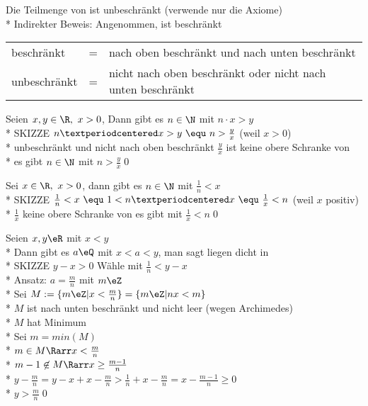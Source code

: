Die Teilmenge \N{} von \R{} ist unbeschränkt
\bew
(verwende nur die Axiome)\\*
Indirekter Beweis: Angenommen, \N{} ist beschränkt
\begin{tabular}{lcl}
beschränkt &=& nach oben beschränkt und nach unten beschränkt\\*
unbeschränkt &=& nicht nach oben beschränkt oder nicht nach unten beschränkt
\end{tabular}
%
Seien $x,y\in\R,\ x>0$, Dann gibt es $n\in\N$ mit $n·x>y$\\*
SKIZZE %
%
\bew
$n·x>y\ \equ\ n>\frac{y}{x}$ (weil $x>0$)\\*
\N{} unbeschränkt und nicht nach oben beschränkt \Rarr{} $\frac{y}{x}$ ist keine obere Schranke von \N\\*
\Rarr{} es gibt $n\in\N$ mit $n>\frac{y}{x}$\qed

Sei $x\in\R,\ x>0$, dann gibt es $n\in\N$ mit $\frac{1}{n}<x$\\*
SKIZZE %
\bew
$\frac{1}{n}<x\ \equ\ 1<n·x\ \equ\ \frac{1}{x}<n$ (weil $x$ positiv)\\*
$\frac{1}{x}$ keine obere Schranke von \N{} \Rarr{} es gibt \nN{} mit $\frac{1}{x}<n$\qed

Seien $x,y\eR$ mit $x<y$\\*
Dann gibt es $a\eQ$ mit $x<a<y$, man sagt \Q{} liegen dicht in \R\\*
SKIZZE %
\bew
$y-x>0$ Wähle \nN{} mit $\frac{1}{n}<y-x$\\*
Ansatz: $a=\frac{m}{n}$ mit $m\eZ$\\*
Sei $M:=\{m\eZ|x<\frac{m}{n}\}=\{m\eZ|nx<m\}$\\*
$M$ ist nach unten beschränkt und nicht leer (wegen Archimedes)\\*
$M$ hat Minimum\\*
Sei $m=min(M)$\\*
$m\in M \Rarr x<\frac{m}{n}$\\*
$m-1\not\in M \Rarr x\geq\frac{m-1}{n}$\\*
$y-\frac{m}{n} =y-x+x-\frac{m}{n}>\frac{1}{n}+x-\frac{m}{n}=x-\frac{m-1}{n}\geq0$\\*
$y>\frac{m}{n}$\qed

